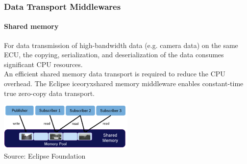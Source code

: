 \begin{frame}
\frametitle{Data Transport Middlewares}
\framesubtitle{Shared memory}
For data transmission of high-bandwidth data (e.g. camera data) on the same
ECU, the copying, serialization, and deserialization of the data consumes
significant CPU resources.\\

An efficient shared memory data transport is required to reduce the CPU
overhead. The Eclipse iceoryx\texttrademark\footnotemark[1] shared memory
middleware enables constant-time true zero-copy data transport.

\begin{center}
\includegraphics[width=0.5\textwidth]{images/shared_memory.png}\\
\footnotesize Source: Eclipse Foundation\footnotemark[1]
\end{center}
\end{frame}

